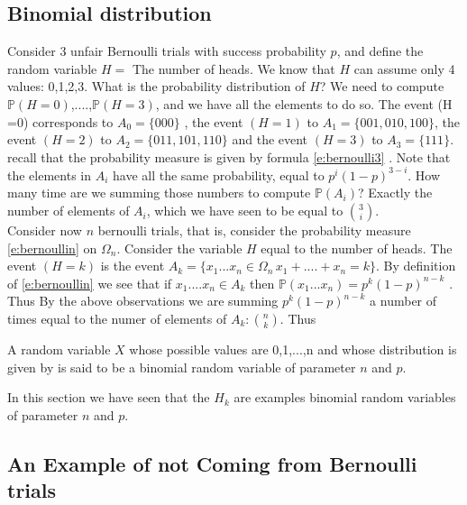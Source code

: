 \subsection{Binomial distribution}
Consider $3$ unfair Bernoulli trials with success probability $p$, and define the random variable $H= $ The number of heads. We know that $H$ can assume only 4 values: 0,1,2,3.  What is the probability distribution of $H$? We need to compute $\mathbb{P}(H=0)$,....,$\mathbb{P}(H = 3)$, and we have all the elements to do so. 
The event (H =0) corresponds to $A_0=\{000\}$ , the event $( H = 1) $ to $A_1 = \{001,010,100\}$, the event $(H =2 ) $ to $A_2=\{011,101,110\}$ and the event $(H = 3) $ to $A_3 =\{111\}$. 
recall that the probability measure is given by formula \eqref{e:bernoulli3} . 
Note that the elements in $A_i$ have all the same probability, equal to $p^i(1-p)^{3-i}$. How many time are we summing those numbers to compute $\mathbb{P}(A_i)$? Exactly the number of elements of $A_i$, which we have seen to be equal to ${3\choose i}$. \\
Consider now $n$ bernoulli trials, that is, consider the probability measure \eqref{e:bernoullin} on $\Omega_n$. Consider the variable $H$ equal to the number of heads. The event $ (H = k) $ is the event $A_k = \{x_1...x_n\in \Omega_n\, x_1+....+x_n = k\}$. By definition of \eqref{e:bernoullin} we see that  if $x_1....x_n\in A_k $ then $\mathbb{P}(x_1...x_n)= p^k(1-p)^{n-k}$ . Thus 
By the above observations we are summing $p^k(1-p)^{n-k}$ a number of times equal to the numer of elements of $A_k: {n\choose k}$. Thus
\begin{definition}
	A random variable $X$ whose possible values are 0,1,...,n and whose distribution is given by 
	is said to be a binomial random variable of parameter $n$ and $p$. 
\end{definition}
In this section we have seen that the $H_k$ are examples binomial random variables of parameter $n$ and $p$. 

	\subsection{An Example of not Coming from Bernoulli trials}
	
